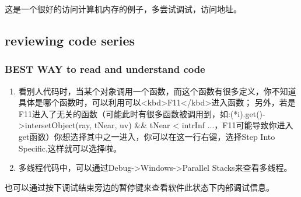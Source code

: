这是一个很好的访问计算机内存的例子，多尝试调试，访问地址。

\subsection{reviewing code series}


\subsubsection{BEST WAY to read and understand code}

\begin{enumerate} 
    \item 看别人代码时，当某个对象调用一个函数，而这个函数有很多定义，你不知道具体是哪个函数时，可以利用可以<kbd>F11</kbd>进入函数；  
    另外，若是F11进入了无关的函数（可能此时有很多函数被调用到，如:(*i).get()->intersetObject(ray, tNear, uv) \&\& tNear < intrInf ...，F11可能导致你进入get函数）你想选择其中之一进入，你可以在这一行右键，选择Step Into Specific,这样就可以选择啦。
    \item 多线程代码中，可以通过Debug->Windows->Parallel Stacks来查看多线程。  
\end{enumerate}
 
也可以通过按下调试结束旁边的暂停键来查看软件此状态下内部调试信息。













































































